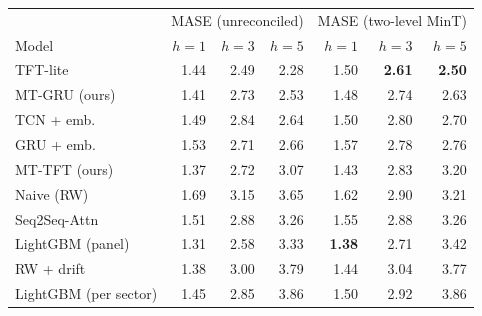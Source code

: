 \begin{tabular}{lrrrrrr}
\toprule
 & \multicolumn{3}{c}{MASE (unreconciled)} & \multicolumn{3}{c}{MASE (two-level MinT)} \\
Model & $h{=}1$ & $h{=}3$ & $h{=}5$ & $h{=}1$ & $h{=}3$ & $h{=}5$ \\
\midrule
TFT-lite & 1.44 & 2.49 & 2.28 & 1.50 & \textbf{2.61} & \textbf{2.50} \\
MT-GRU (ours) & 1.41 & 2.73 & 2.53 & 1.48 & 2.74 & 2.63 \\
TCN + emb. & 1.49 & 2.84 & 2.64 & 1.50 & 2.80 & 2.70 \\
GRU + emb. & 1.53 & 2.71 & 2.66 & 1.57 & 2.78 & 2.76 \\
MT-TFT (ours) & 1.37 & 2.72 & 3.07 & 1.43 & 2.83 & 3.20 \\
Naive (RW) & 1.69 & 3.15 & 3.65 & 1.62 & 2.90 & 3.21 \\
Seq2Seq-Attn & 1.51 & 2.88 & 3.26 & 1.55 & 2.88 & 3.26 \\
LightGBM (panel) & 1.31 & 2.58 & 3.33 & \textbf{1.38} & 2.71 & 3.42 \\
RW + drift & 1.38 & 3.00 & 3.79 & 1.44 & 3.04 & 3.77 \\
LightGBM (per sector) & 1.45 & 2.85 & 3.86 & 1.50 & 2.92 & 3.86 \\
\bottomrule
\end{tabular}
